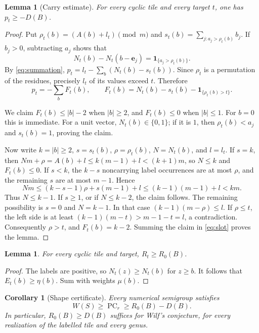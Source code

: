 \documentclass[11pt]{article}
\newtheorem{lemma}[theorem]{Lemma}
\newtheorem{corollary}[theorem]{Corollary}
\theoremstyle{definition}
\theoremstyle{remark}
\newcommand{\PC}{\operatorname{PC}}
\newcommand{\ind}[1]{\mathbf{1}_{\{#1\}}}
\begin{document}
\begin{lemma}[Carry estimate]\label{lem:carry}
For every cyclic tile and every target $t$, one has $p_t\ge-D(B)$.
\end{lemma}
\begin{proof}
Put $\rho_t(b)=(A(b)+l_t)\pmod m$ and
$s_t(b)=\sum_{j:a_j>\rho_t(b)}b_j$.
If $b_j>0$, subtracting $a_j$ shows that
\[
N_t(b)-N_t(b-\mathbf e_j)=\ind{a_j>\rho_t(b)}.
\]
By \eqref{eq:summation},
$p_t=l_t-\sum_b(N_t(b)-s_t(b))$.
Since $\rho_t$ is a permutation of the residues, precisely $l_t$ of its
values exceed $t$. Therefore
\begin{equation}\label{eq:slot}
p_t=-\sum_b F_t(b),\qquad
F_t(b)=N_t(b)-s_t(b)-\ind{\rho_t(b)>t}.
\end{equation}

We claim $F_t(b)\le |b|-2$ when $|b|\ge2$, and $F_t(b)\le0$ when
$|b|\le1$. For $b=0$ this is immediate. For a unit vector,
$N_t(b)\in\{0,1\}$; if it is $1$, then $\rho_t(b)<a_j$ and
$s_t(b)=1$, proving the claim.

Now write $k=|b|\ge2$, $s=s_t(b)$, $\rho=\rho_t(b)$, $N=N_t(b)$,
and $l=l_t$. If $s=k$, then
$Nm+\rho=A(b)+l\le k(m-1)+l<(k+1)m$, so $N\le k$ and $F_t(b)\le0$.
If $s<k$, the $k-s$ noncarrying label occurrences are at most $\rho$,
and the remaining $s$ are at most $m-1$. Hence
\[
Nm\le(k-s-1)\rho+s(m-1)+l
\le(k-1)(m-1)+l<km.
\]
Thus $N\le k-1$. If $s\ge1$, or if $N\le k-2$, the claim follows.
The remaining possibility is $s=0$ and $N=k-1$. In that case
$(k-1)(m-\rho)\le l$. If $\rho\le t$, the left side is at least
$(k-1)(m-t)>m-1-t=l$, a contradiction. Consequently $\rho>t$, and
$F_t(b)=k-2$. Summing the claim in \eqref{eq:slot} proves the lemma.
\end{proof}

\begin{lemma}\label{lem:height}
For every cyclic tile and target, $R_t\ge R_0(B)$.
\end{lemma}
\begin{proof}
The labels are positive, so $N_t(z)\ge N_t(b)$ for $z\ge b$.
It follows that $E_t(b)\ge\eta(b)$. Sum with weights $\mu(b)$.
\end{proof}

\begin{corollary}[Shape certificate]\label{cor:shape}
Every numerical semigroup satisfies
\begin{equation}\label{eq:shapebound}
W(S)\ge\PC_r\ge R_0(B)-D(B).
\end{equation}
In particular, $R_0(B)\ge D(B)$ suffices for Wilf's conjecture, for
every realization of the labelled tile and every genus.
\end{corollary}
\end{document}

